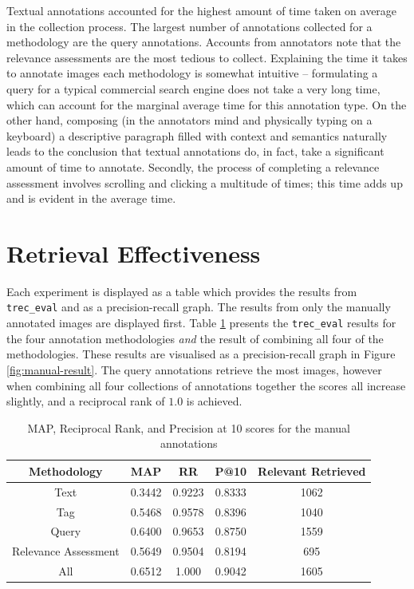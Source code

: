 Textual annotations accounted for the highest amount of time taken on average in the collection process. The largest number of annotations collected for a methodology are the query annotations. Accounts from annotators note that the relevance assessments are the most tedious to collect. Explaining the time it takes to annotate images each methodology is somewhat intuitive -- formulating a query for a typical commercial search engine does not take a very long time, which can account for the marginal average time for this annotation type. On the other hand, composing (in the annotators mind and physically typing on a keyboard) a descriptive paragraph filled with context and semantics naturally leads to the conclusion that textual annotations do, in fact, take a significant amount of time to annotate. Secondly, the process of completing a relevance assessment involves scrolling and clicking a multitude of times; this time adds up and is evident in the average time.

\FloatBarrier
\section{Retrieval Effectiveness}

Each experiment is displayed as a table which provides the results from \verb|trec_eval| and as a precision-recall graph. The results from only the manually annotated images are displayed first. Table \ref{table:manual-results} presents the \verb|trec_eval| results for the four annotation methodologies \textit{and} the result of combining all four of the methodologies. These results are visualised as a precision-recall graph in Figure \ref{fig:manual-result}. The query annotations retrieve the most images, however when combining all four collections of annotations together the scores all increase slightly, and a reciprocal rank of $1.0$ is achieved.

\begin{table}[ht]
    \centering
    \begin{tabular}{|c|c|c|c|c|}
        \hline
         Methodology & MAP & RR & P@10 & Relevant Retrieved \\ \hline
         Text & 0.3442 & 0.9223 & 0.8333 & 1062 \\ \hline
         Tag & 0.5468 & 0.9578 & 0.8396 & 1040 \\ \hline
         Query & 0.6400 & 0.9653 & 0.8750 & 1559 \\ \hline
         Relevance Assessment & 0.5649 & 0.9504 & 0.8194 & 695 \\ \hline
         All & 0.6512 & 1.000 & 0.9042 & 1605 \\ \hline
    \end{tabular}
    \caption{MAP, Reciprocal Rank, and Precision at 10 scores for the manual annotations}
    \label{table:manual-results}
\end{table}

